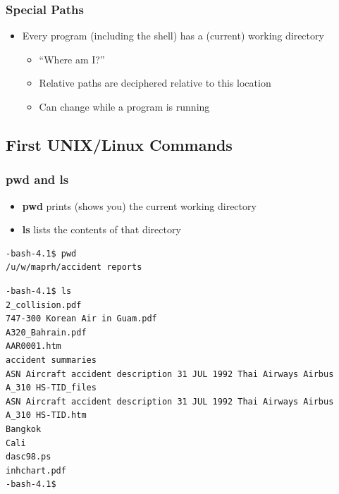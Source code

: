 \documentclass{beamer}
\begin{document}
\begin{frame}[fragile]\frametitle{Special Paths}
\begin{itemize}
\item Every program (including the shell) has a (current) working directory
\begin{itemize}
    \item “Where am I?”
    \item Relative paths are deciphered relative to this location
    \item Can change while a program is running
\end{itemize}
\end{itemize}
\end{frame}

\subsection{First  UNIX/Linux Commands}

\begin{frame}[fragile]\frametitle{pwd and ls}
\begin{itemize}
\item \textbf{pwd} prints (shows you) the current working directory
\end{itemize}
\begin{itemize}
\item \textbf{ls} lists the contents of that directory
\end{itemize}
\end{frame}

\begin{frame}[fragile]
\begin{block}{}
\begin{lstlisting}
-bash-4.1$ pwd
/u/w/maprh/accident reports
\end{lstlisting}
\end{block}
\end{frame}

\begin{frame}[fragile]
\begin{block}{}
\begin{lstlisting}
-bash-4.1$ ls
2_collision.pdf
747-300 Korean Air in Guam.pdf
A320_Bahrain.pdf
AAR0001.htm
accident summaries
ASN Aircraft accident description 31 JUL 1992 Thai Airways Airbus A_310 HS-TID_files
ASN Aircraft accident description 31 JUL 1992 Thai Airways Airbus A_310 HS-TID.htm
Bangkok
Cali
dasc98.ps
inhchart.pdf
-bash-4.1$ 
\end{lstlisting}
\end{block}
\end{frame}
\end{document}
